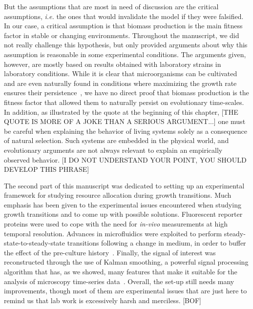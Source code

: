 But the assumptions that are most in need of discussion are the critical assumptions, \textit{i.e.} the ones that would invalidate the model if they were falsified.
In our case, a critical assumption is that biomass production is the main fitness factor in stable or changing environments.
Throughout the manuscript, we did not really challenge this hypothesis, but only provided arguments about why this assumption is reasonable in some experimental conditions.
The arguments given, however, are mostly based on results obtained with laboratory strains in laboratory conditions.
While it is clear that microorganisms can be cultivated and are even naturally found in conditions where maximizing the growth rate ensures their persistence~\cite{edwards_silico_2001,ibarra_escherichia_2002,lewis_omic_2010,molenaar_shifts_2009}, we have no direct proof that biomass production is the fitness factor that allowed them to naturally persist on evolutionary time-scales.
In addition, as illustrated by the quote at the beginning of this chapter, [THE QUOTE IS MORE OF A JOKE THAN A SERIOUS ARGUMENT...] one must be careful when explaining the behavior of living systems solely as a consequence of natural selection.
Such systems are embedded in the physical world, and evolutionary arguments are not always relevant to explain an empirically observed behavior. [I DO NOT UNDERSTAND YOUR POINT, YOU SHOULD DEVELOP THIS PHRASE]

The second part of this manuscript was dedicated to setting up an experimental framework for studying resource allocation during growth transitions.
Much emphasis has been given to the experimental issues encountered when studying growth transitions and to come up with possible solutions.
Fluorescent reporter proteins were used to cope with the need for \textit{in-vivo} measurements at high temporal resolution.
Advances in microfluidics were exploited to perform steady-state-to-steady-state transitions following a change in medium, in order to buffer the effect of the pre-culture history~\cite{ng_damage_1962,dufrenne_effect_1997,shaw_effect_1967}.
Finally, the signal of interest was reconstructed through the use of Kalman smoothing, a powerful signal processing algorithm that has, as we showed, many features that make it suitable for the analysis of microscopy time-series data~\cite{kailath_linear_2000,jazwinski_stochastic_2007,kalman_new_1960}.
Overall, the set-up still needs many improvements, though most of them are experimental issues that are just here to remind us that lab work is excessively harsh and merciless. [BOF]


